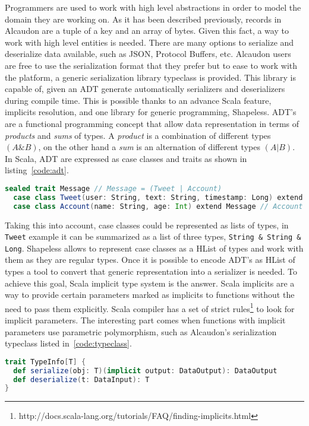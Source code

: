 Programmers are used to work with high level abstractions in order to model the
domain they are working on. As it has been described previously, records in
Alcaudon are a tuple of a key and an array of bytes. Given this fact, a way to
work with high level entities is needed. There are many options to serialize and
deserialize data available, such as JSON, Protocol Buffers, etc. Alcaudon users
are free to use the serialization format that they prefer but to ease to work
with the platform, a generic serialization library typeclass is provided. This
library is capable of, given an \acs{ADT} generate automatically serializers and
deserializers during compile time. This is possible thanks to an advance Scala
feature, implicits resolution, and one library for generic programming,
Shapeless. \acs{ADT}'s are a functional programming concept that allow data
representation in terms of \textit{products} and \textit{sums} of types. A
\textit{product} is a combination of different types $(A \& B)$, on the other
hand a \textit{sum} is an alternation of different types $(A | B)$. In Scala,
\acs{ADT} are expressed as case classes and traits as shown in
listing~\ref{code:adt}.

\begin{lstlisting}[language=scala, frame=trBL, label=code:adt, float=ht, caption = {\acs{ADT} example}]
  sealed trait Message // Message = (Tweet | Account)
  case class Tweet(user: String, text: String, timestamp: Long) extend Message // Tweet = (String & String & Long)
  case class Account(name: String, age: Int) extend Message // Account = (String & Int)
\end{lstlisting}

Taking this into account, case classes could be represented as lists of types,
in \lstinline[columns=fixed]{Tweet} example it can be summarized as a list of
three types, \lstinline[columns=fixed]{String & String & Long}. Shapeless allows
to represent case classes as a \acf{HList} of types and work with them
as they are regular types. Once it is possible to encode \acs{ADT}'s as
\acs{HList} of types a tool to convert that generic representation into
a serializer is needed. To achieve this goal, Scala implicit type system is the
answer. Scala implicits are a way to provide certain parameters marked as
implicits to functions without the need to pass them explicitly. Scala compiler has
a set of strict rules\footnote{http://docs.scala-lang.org/tutorials/FAQ/finding-implicits.html}
to look for implicit parameters. The interesting part comes when functions with implicit
parameters use parametric polymorphism, such as Alcaudon's serialization typeclass
listed in~\ref{code:typeclass}.
\begin{lstlisting}[language=scala, frame=trBL, label=code:typeclass, float=ht, caption = {Serializer Deserializer typeclass}]
trait TypeInfo[T] {
  def serialize(obj: T)(implicit output: DataOutput): DataOutput
  def deserialize(t: DataInput): T
}
\end{lstlisting}

